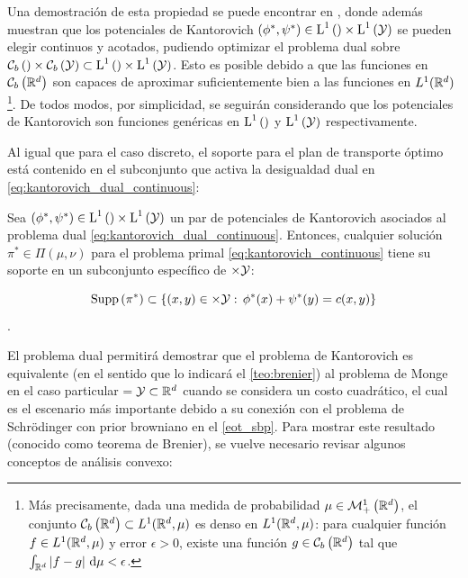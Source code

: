 Una demostración de esta propiedad se puede encontrar en \cite{villani2003topics}, donde además muestran que los potenciales de Kantorovich $(\phi^*,\psi^*)\in \operatorname{L}^{1}\left(\right)\times\operatorname{L}^{1}\left(\mathcal{Y}\right)$ se pueden elegir continuos y acotados, pudiendo optimizar el problema dual sobre $\mathcal{C}_b\left(\right)\times\mathcal{C}_b\left(\mathcal{Y}\right)\subset\operatorname{L}^{1}\left(\right)\times\operatorname{L}^{1}\left(\mathcal{Y}\right)$. Esto es posible debido a que las funciones en $\mathcal{C}_b\left(\mathbb{R}^d\right)$ son capaces de aproximar suficientemente bien a las funciones en $L^1(\mathbb{R}^d)$\footnote{Más precisamente, dada una medida de probabilidad $\mu\in\mathcal{M}_+^1\left(\mathbb{R}^d\right)$, el conjunto $\mathcal{C}_b\left(\mathbb{R}^d\right)\subset L^1(\mathbb{R}^d,\mu)$ es denso en $L^1(\mathbb{R}^d,\mu)$: para cualquier función $f\in L^1(\mathbb{R}^d,\mu)$ y error $\epsilon>0$, existe una función $g\in\mathcal{C}_b\left(\mathbb{R}^d\right)$ tal que $\int_{\mathbb{R}^d} |f-g| \,\operatorname{d}\!\mu<\epsilon$.}. De todos modos, por simplicidad, se seguirán considerando que los potenciales de Kantorovich son funciones genéricas en $\operatorname{L}^{1}\left(\right)$ y $\operatorname{L}^{1}\left(\mathcal{Y}\right)$ respectivamente.

Al igual que para el caso discreto, el soporte para el plan de transporte óptimo está contenido en el subconjunto que activa la desigualdad dual en \eqref{eq:kantorovich_dual_continuous}:

\begin{cor}
	\label{cor:supp_slackness}
	Sea $(\phi^*,\psi^*)\in \operatorname{L}^{1}\left(\right)\times\operatorname{L}^{1}\left(\mathcal{Y}\right)$ un par de potenciales de Kantorovich asociados al problema dual \eqref{eq:kantorovich_dual_continuous}. Entonces, cualquier solución $\pi^*\in\Pi(\mu,\nu)$ para el problema primal \eqref{eq:kantorovich_continuous} tiene su soporte en un subconjunto específico de $\times\mathcal{Y}$:

	\begin{equation*}
		\operatorname{Supp}\left(\pi^*\right)
		\subset \{(x,y)\in\times\mathcal{Y}:\, \phi^*(x) + \psi^*(y) = c(x,y)\}
	\end{equation*}.
\end{cor}

El problema dual permitirá demostrar que el problema de Kantorovich es equivalente (en el sentido que lo indicará el \autoref{teo:brenier}) al problema de Monge en el caso particular $=\mathcal{Y}\subset\mathbb{R}^d$ cuando se considera un costo cuadrático, el cual es el escenario más importante debido a su conexión con el problema de Schrödinger con prior browniano en el \autoref{eot_sbp}. Para mostrar este resultado (conocido como teorema de Brenier), se vuelve necesario revisar algunos conceptos de análisis convexo:

